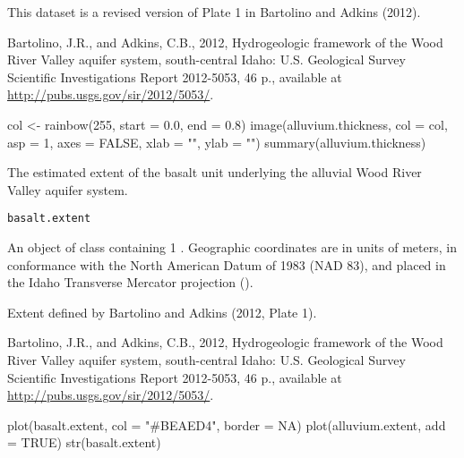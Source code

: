 \documentclass[letterpaper]{book}
\begin{document}
%
\begin{Source}\relax
This dataset is a revised version of Plate 1 in Bartolino and Adkins (2012).
\end{Source}
%
\begin{References}\relax
Bartolino, J.R., and Adkins, C.B., 2012, Hydrogeologic framework of the Wood River Valley aquifer system, south-central Idaho: U.S. Geological Survey Scientific Investigations Report 2012-5053, 46 p., available at \url{http://pubs.usgs.gov/sir/2012/5053/}.
\end{References}
%
\begin{Examples}
\begin{ExampleCode}
col <- rainbow(255, start = 0.0, end = 0.8)
image(alluvium.thickness, col = col, asp = 1, axes = FALSE, xlab = "", ylab = "")
summary(alluvium.thickness)
\end{ExampleCode}
\end{Examples}
%
\begin{Description}\relax
The estimated extent of the basalt unit underlying the alluvial Wood River Valley aquifer system.
\end{Description}
%
\begin{Usage}
\begin{verbatim}
basalt.extent
\end{verbatim}
\end{Usage}
%
\begin{Format}
An object of  class containing 1 .
Geographic coordinates are in units of meters, in conformance with the North American Datum of 1983 (NAD 83), and placed in the
Idaho Transverse Mercator projection ().
\end{Format}
%
\begin{Source}\relax
Extent defined by Bartolino and Adkins (2012, Plate 1).
\end{Source}
%
\begin{References}\relax
Bartolino, J.R., and Adkins, C.B., 2012, Hydrogeologic framework of the Wood River Valley aquifer system, south-central Idaho: U.S. Geological Survey Scientific Investigations Report 2012-5053, 46 p., available at \url{http://pubs.usgs.gov/sir/2012/5053/}.
\end{References}
%
\begin{Examples}
\begin{ExampleCode}
plot(basalt.extent, col = "#BEAED4", border = NA)
plot(alluvium.extent, add = TRUE)
str(basalt.extent)
\end{ExampleCode}
\end{Examples}
\end{document}
